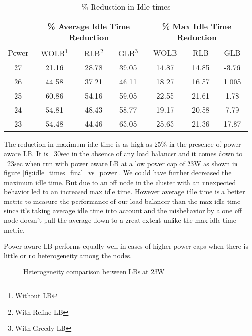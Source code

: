 \begin{table}[h]
\begin{tabular}{|c|c|c|c|c|c|c|}
\hline
 & \multicolumn{3}{c|}{\% Average Idle Time Reduction} & \multicolumn{3}{c|}{\% Max Idle Time Reduction} \\ \hline
Power & WOLB\footnote{Without LB} & RLB\footnote{With  Refine LB} & GLB\footnote{With Greedy LB} & WOLB & RLB & GLB \\ \hline
27 & 21.16 & 28.78 & 39.05 & 14.87 & 14.85 & -3.76 \\ \hline
26 & 44.58 & 37.21 & 46.11 & 18.27 & 16.57 & 1.005 \\ \hline
25 & 60.86 & 54.16 & 59.05 & 22.55 & 21.61 & 1.78 \\ \hline
24 & 54.81 & 48.43 & 58.77 & 19.17 & 20.58 & 7.79 \\ \hline
23 & 54.48 & 44.46 & 63.05 & 25.63 & 21.36 & 17.87 \\ \hline
\end{tabular}
\caption{\% Reduction in Idle times}
\label{tb:2}
\end{table}



The reduction in maximum idle time is as high as 25\% in the presence of power
aware LB. It is ~30sec in the absence of any load balancer and it comes down to
~23sec when run with power aware LB at a low power cap of 23W as shown in
figure \ref{fig:idle_times_final_vs_power}. We could have further decreased
the maximum idle time. But due to an off node in the cluster with an unexpected
behavior led to an increased max idle time. However average idle time is a
better metric to measure the performance of our load balancer than the max idle
time since it’s taking average idle time into account and the misbehavior by a
one off node doesn’t pull the average down to a great extent unlike the max
idle time metric.

Power aware LB performs equally well in cases of higher power caps when there
is little or no heterogeneity among the nodes. 

\begin{figure}
\centering
\caption{Heterogeneity comparison between LBs at 23W} 
\label{fig:heter_final}
\end{figure}

